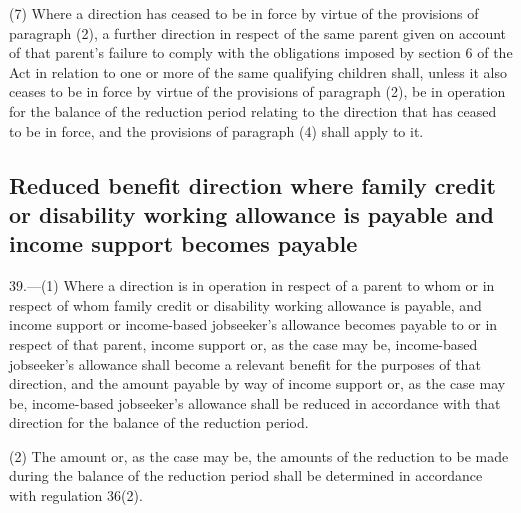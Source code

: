 \documentclass[a4paper,12pt]{article}
\begin{document}
(7) Where a direction has ceased to be in force by virtue of the provisions of paragraph (2), a further direction in respect of the same parent given on account of that parent’s failure to comply with the obligations imposed by section 6 of the Act in relation to one or more of the same qualifying children shall, unless it also ceases to be in force by virtue of the provisions of paragraph (2), be in operation for the balance of the reduction period relating to the direction that has ceased to be in force, and the provisions of paragraph (4) shall apply to it.


\subsection[39. Reduced benefit direction where family credit or disability working allowance is payable and income support becomes payable]{\sloppy Reduced benefit direction where family credit or disability working allowance is payable and income support becomes payable}

39.—(1) Where a direction is in operation in respect of a parent to whom or in respect of whom family credit or disability working allowance is payable, and income support 
or income-based jobseeker’s allowance  %
becomes payable to or in respect of that parent, income support 
or, as the case may be, income-based jobseeker’s allowance  %
shall become a relevant benefit for the purposes of that direction, and the amount payable by way of income support 
or, as the case may be, income-based jobseeker’s allowance  %
shall be reduced in accordance with that direction for the balance of the reduction period.

(2) The amount or, as the case may be, the amounts of the reduction to be made during the balance of the reduction period shall be determined in accordance with regulation 36(2).
\end{document}
